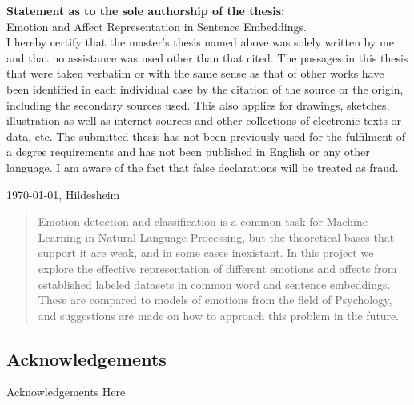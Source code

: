 \documentclass[a4paper,12pt]{report}
\begin{document}


\setcounter{secnumdepth}{1}


\noindent \textbf{Statement as to the sole authorship of the thesis:}
\vspace{0.4cm}
\\Emotion and Affect Representation in Sentence Embeddings.\\
I hereby certify that the master's thesis named above was solely written by me and that no assistance was used other than that cited. The passages in this thesis that were taken verbatim or with the same sense as that of other works have been identified in each individual case by the citation of the source or the origin, including the secondary sources used. This also applies for drawings, sketches, illustration as well as internet sources and other collections of electronic texts or data, etc. The submitted thesis has not been previously used for the fulfilment of a degree requirements and has not been published in English or any other language. I am aware of the fact that false declarations will be treated as fraud.
\vspace{7cm}

\today, Hildesheim

\thispagestyle{empty}
\setcounter{tocdepth}{2}
\newpage

\begin{abstract}

Emotion detection and classification is a common task for Machine Learning in Natural Language Processing, but the theoretical bases that support it are weak, and in some cases inexistant. In this project we explore the effective representation of different emotions and affects from established labeled datasets in common word and sentence embeddings. These are compared to models of emotions from the field of Psychology, and suggestions are made on how to approach this problem in the future.

\vfill
\end{abstract}

\newpage

\begin{center}
\section*{Acknowledgements}\label{sec:Acknowledgements}
Acknowledgements Here

\vfill
\end{center}
\end{document}
